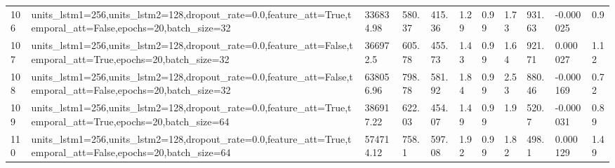 \begin{longtable}{C{0.8cm} L{2cm} C{1.15cm} C{1.15cm} C{1.15cm} C{1.15cm} C{0.85cm} C{1.25cm} C{1.2cm} C{1.5cm} C{1.0cm}}
106 & units\_lstm1=256,\newline units\_lstm2=128,\newline dropout\_rate=0.0,\newline feature\_att=True,\newline temporal\_att=False,\newline epochs=20,\newline batch\_size=32 & 336834.98 & 580.37 & 415.36 & 1.29 & 0.99 & 1.73 & 931.63 & -0.000025 & 0.9 \\
107 & units\_lstm1=256,\newline units\_lstm2=128,\newline dropout\_rate=0.0,\newline feature\_att=False,\newline temporal\_att=True,\newline epochs=20,\newline batch\_size=32 & 366972.5 & 605.78 & 455.73 & 1.43 & 0.99 & 1.64 & 921.71 & 0.000027 & 1.12 \\
108 & units\_lstm1=256,\newline units\_lstm2=128,\newline dropout\_rate=0.0,\newline feature\_att=False,\newline temporal\_att=False,\newline epochs=20,\newline batch\_size=32 & 638056.96 & 798.78 & 581.92 & 1.84 & 0.99 & 2.53 & 880.46 & -0.000169 & 0.72 \\
109 & units\_lstm1=256,\newline units\_lstm2=128,\newline dropout\_rate=0.0,\newline feature\_att=True,\newline temporal\_att=True,\newline epochs=20,\newline batch\_size=64 & 386917.22 & 622.03 & 454.07 & 1.49 & 0.99 & 1.9 & 520.7 & -0.000031 & 0.89 \\
110 & units\_lstm1=256,\newline units\_lstm2=128,\newline dropout\_rate=0.0,\newline feature\_att=True,\newline temporal\_att=False,\newline epochs=20,\newline batch\_size=64 & 574714.12 & 758.1 & 597.08 & 1.92 & 0.99 & 1.82 & 498.1 & 0.000129 & 1.49 \\

\end{longtable}
